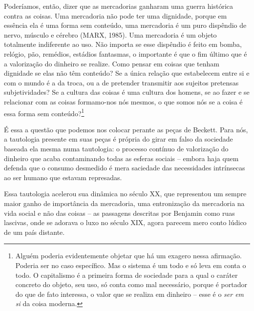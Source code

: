 Poderíamos, então, dizer que as mercadorias ganharam uma guerra
histórica contra as coisas. Uma mercadoria não pode ter uma dignidade,
porque em essência ela é uma forma sem conteúdo, uma mercadoria é um
puro dispêndio de nervo, músculo e cérebro (MARX, 1985). Uma mercadoria
é um objeto totalmente indiferente ao uso. Não importa se esse dispêndio
é feito em bomba, relógio, pão, remédios, estádios fantasmas, o
importante é que o fim último que é a valorização do dinheiro se
realize. Como pensar em coisas que tenham dignidade se elas não têm
conteúdo? Se a única relação que estabelecem entre si e com o mundo é a
da troca, ou a de pretender transmitir aos sujeitos pretensas
subjetividades? Se a cultura das coisas é uma cultura dos homens, se ao
fazer e se relacionar com as coisas formamo-nos nós mesmos, o que somos
nós se a coisa é essa forma sem conteúdo?\footnote{Alguém poderia
  evidentemente objetar que há um exagero nessa afirmação. Poderia ser
  no caso específico. Mas o sistema é um todo e só leva em conta o todo.
  O capitalismo é a primeira forma de sociedade para a qual o caráter
  concreto do objeto, seu uso, só conta como mal necessário, porque é
  portador do que de fato interessa, o valor que se realiza em dinheiro
  -- esse é o \emph{ser em si} da coisa moderna.}

É essa a questão que podemos nos colocar perante as peças de Beckett.
Para nós, a tautologia presente em suas peças é própria do girar em
falso da sociedade baseada ela mesma numa tautologia: o processo
contínuo de valorização do dinheiro que acaba contaminando todas as
esferas sociais -- embora haja quem defenda que o consumo desmedido é
mera saciedade das necessidades intrínsecas ao ser humano que estavam
represadas.

Essa tautologia acelerou sua dinâmica no século XX, que representou um
sempre maior ganho de importância da mercadoria, uma entronização da
mercadoria na vida social e não das coisas -- as passagens descritas por
Benjamin como ruas lascivas, onde se adorava o luxo no século XIX, agora
parecem mero conto lúdico de um país distante.

